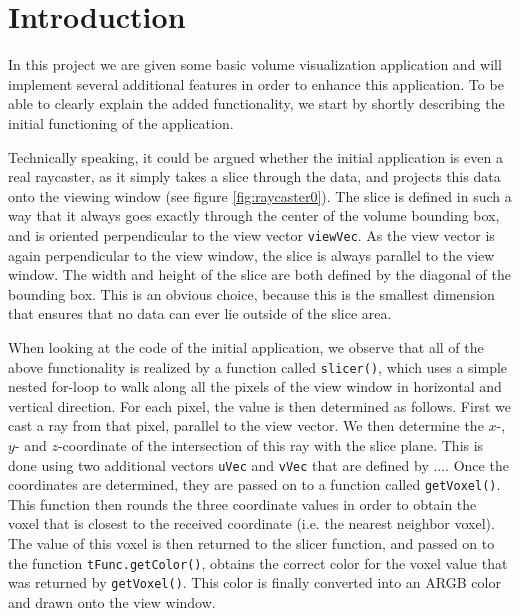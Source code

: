 \section{Introduction}\label{sec:intro}
In this project we are given some basic volume visualization application and will implement several additional features in order to enhance this application. To be able to clearly explain the added functionality, we start by shortly describing the initial functioning of the application. 

Technically speaking, it could be argued whether the initial application is even a real raycaster, as it simply takes a slice through the data, and projects this data onto the viewing window (see figure \ref{fig:raycaster0}). The slice is defined in such a way that it always goes exactly through the center of the volume bounding box, and is oriented perpendicular to the view vector \texttt{viewVec}. As the view vector is again perpendicular to the view window, the slice is always parallel to the view window. The width and height of the slice are both defined by the diagonal of the bounding box. This is an obvious choice, because this is the smallest dimension that ensures that no data can ever lie outside of the slice area. 

When looking at the code of the initial application, we observe that all of the above functionality is realized by a function called \texttt{slicer()}, which uses a simple nested for-loop to walk along all the pixels of the view window in horizontal and vertical direction. For each pixel, the value is then determined as follows. First we cast a ray from that pixel, parallel to the view vector. We then determine the $x$-, $y$- and $z$-coordinate of the intersection of this ray with the slice plane. This is done using two additional vectors \texttt{uVec} and \texttt{vVec} that are defined by ...\todo{!}. Once the coordinates are determined, they are passed on to a function called \texttt{getVoxel()}. This function then rounds the three coordinate values in order to obtain the voxel that is closest to the received coordinate (i.e. the nearest neighbor voxel). The value of this voxel is then returned to the slicer function, and passed on to the function \texttt{tFunc.getColor()}, obtains the correct color for the voxel value that was returned by \texttt{getVoxel()}. This color is finally converted into an ARGB color and drawn onto the view window.

